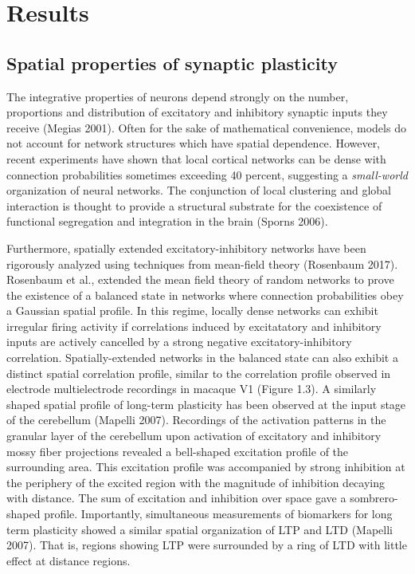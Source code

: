\documentclass{ucetd}
\begin{document}
\section{Results}

\subsection{Spatial properties of synaptic plasticity}

The integrative properties of neurons depend strongly on the number, proportions and distribution of excitatory and inhibitory synaptic inputs they receive (Megias 2001). Often for the sake of mathematical convenience, models do not account for network structures which have spatial dependence. However, recent experiments have shown that local cortical networks can be dense with connection probabilities sometimes exceeding 40 percent, suggesting a \emph{small-world} organization of neural networks. The conjunction of local clustering and global interaction is thought to provide a structural substrate for the coexistence of functional segregation and integration in the brain (Sporns 2006). 

Furthermore, spatially extended excitatory-inhibitory networks have been rigorously analyzed using techniques from mean-field theory (Rosenbaum 2017). Rosenbaum et al., extended the mean field theory of random networks to prove the existence of a balanced state in networks where connection probabilities obey a Gaussian spatial profile. In this regime, locally dense networks can exhibit irregular firing activity if correlations induced by excitatatory and inhibitory inputs are actively cancelled by a strong negative excitatory-inhibitory correlation. Spatially-extended networks in the balanced state can also exhibit a distinct spatial correlation profile, similar to the correlation profile observed in electrode multielectrode recordings in macaque V1 (Figure 1.3). A similarly shaped spatial profile of long-term plasticity has been observed at the input stage of the cerebellum (Mapelli 2007). Recordings of the activation patterns in the granular layer of the cerebellum upon activation of excitatory and inhibitory mossy fiber projections revealed a bell-shaped excitation profile of the surrounding area. This excitation profile was accompanied by strong inhibition at the periphery of the excited region with the magnitude of inhibition decaying with distance. The sum of excitation and inhibition over space gave a sombrero-shaped profile. Importantly, simultaneous measurements of biomarkers for long term plasticity showed a similar spatial organization of LTP and LTD (Mapelli 2007). That is, regions showing LTP were surrounded by a ring of LTD with little effect at distance regions.  
\end{document}
